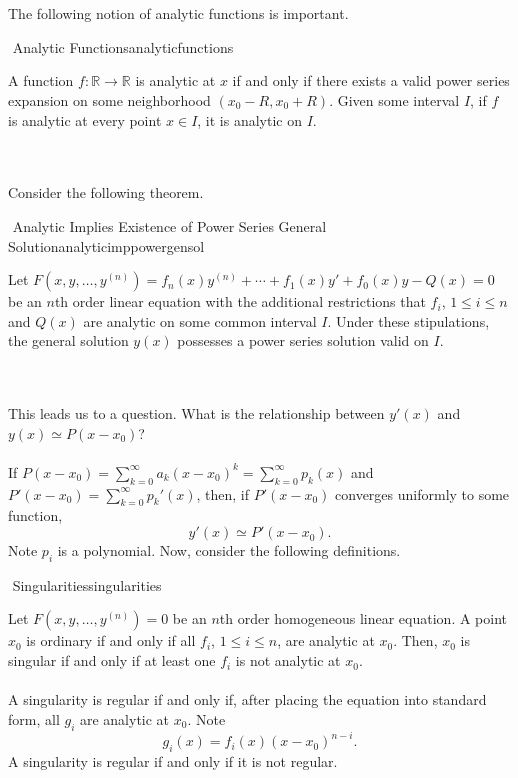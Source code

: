         \vphantom
        \\
        \\
        The following notion of analytic functions is important.
        \begin{definition}{\Stop\,\,Analytic Functions}{analyticfunctions}
            
            A function \(f:\mathbb{R}\to\mathbb{R}\) is analytic at \(x\) if and only if there exists a valid power series expansion on some neighborhood \((x_0-R,x_0+R)\). Given some interval \(I\), if \(f\) is analytic at every point \(x\in I\), it is analytic on \(I\).

        \end{definition}
        \pagebreak
        \vphantom
        \\
        \\
        Consider the following theorem.
        \begin{theorem}{\Stop\,\,Analytic Implies Existence of Power Series General Solution}{analyticimppowergensol}
            
            Let \(F(x,y,\ldots,y^{(n)})=f_n(x)y^{(n)}+\cdots+f_1(x)y'+f_0(x)y-Q(x)=0\) be an \(n\)th order linear equation with the additional restrictions that \(f_i\), \(1\leq i\leq n\) and \(Q(x)\) are analytic on some common interval \(I\). Under these stipulations, the general solution \(y(x)\) possesses a power series solution valid on \(I\).

        \end{theorem}
        \vphantom
        \\
        \\
        This leads us to a question. What is the relationship between \(y'(x)\) and \(y(x)\simeq P(x-x_0)\)?
        \\
        \\
        If \(P(x-x_0)=\sum_{k=0}^\infty a_k(x-x_0)^k=\sum_{k=0}^\infty p_k(x)\) and \(P'(x-x_0)=\sum_{k=0}^\infty p_k'(x)\), then, if \(P'(x-x_0)\) converges uniformly to some function,
        \begin{equation*}
            y'(x)\simeq P'(x-x_0).
        \end{equation*}
        Note \(p_i\) is a polynomial. Now, consider the following definitions.
        \begin{definition}{\Stop\,\,Singularities}{singularities}

            Let \(F(x,y,\ldots,y^{(n)})=0\) be an \(n\)th order homogeneous linear equation. A point \(x_0\) is ordinary if and only if all \(f_i\), \(1\leq i \leq n\), are analytic at \(x_0\). Then, \(x_0\) is singular if and only if at least one \(f_i\) is not analytic at \(x_0\).
            \\
            \\
            A singularity is regular if and only if, after placing the equation into standard form, all \(g_i\) are analytic at \(x_0\). Note
            \begin{equation*}
                g_i(x)=f_i(x)(x-x_0)^{n-i}.
            \end{equation*}
            A singularity is regular if and only if it is not regular.
        \end{definition}

